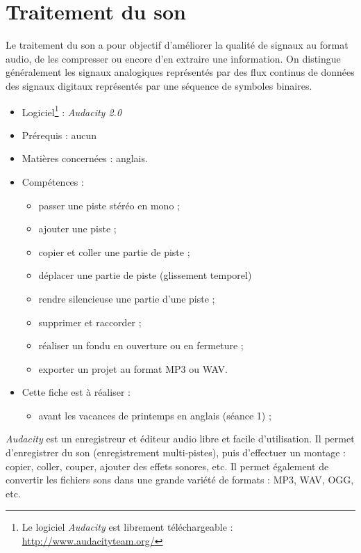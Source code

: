 \chapter{Traitement du son}  

Le traitement du son a pour objectif d'améliorer la qualité de signaux au format audio, de les compresser ou encore d'en extraire une information. On distingue généralement les signaux analogiques représentés par des flux continus de données des signaux digitaux représentés par une séquence de symboles binaires.

{\footnotesize
\begin{itemize}
\item Logiciel\footnote{Le logiciel \emph{Audacity} est librement téléchargeable : \url{http://www.audacityteam.org/}} : \emph{Audacity 2.0} 
\item Prérequis : aucun
\item Matières concernées : anglais.
\item Compétences : 
        \begin{itemize}
        \item passer une piste stéréo en mono ;
        \item ajouter une piste ;
        \item copier et coller une partie de piste ;
        \item déplacer une partie de piste (glissement temporel)
        \item rendre silencieuse une partie d'une piste ;
        \item supprimer et raccorder ;
        \item réaliser un fondu en ouverture ou en fermeture ;
        \item exporter un projet au format MP3 ou WAV.
        \end{itemize}
\item Cette fiche est à réaliser :
        \begin{itemize}
        \item avant les vacances de printemps en anglais (séance 1) ;
        \end{itemize}
\end{itemize}
}%




\emph{Audacity} est un enregistreur et éditeur audio libre et facile d'utilisation. Il permet d'enregistrer du son (enregistrement multi-pistes), puis d'effectuer un montage : copier, coller, couper, ajouter des effets sonores, etc. Il permet également de convertir les fichiers sons dans une grande variété de formats : MP3, WAV, OGG, etc. 














